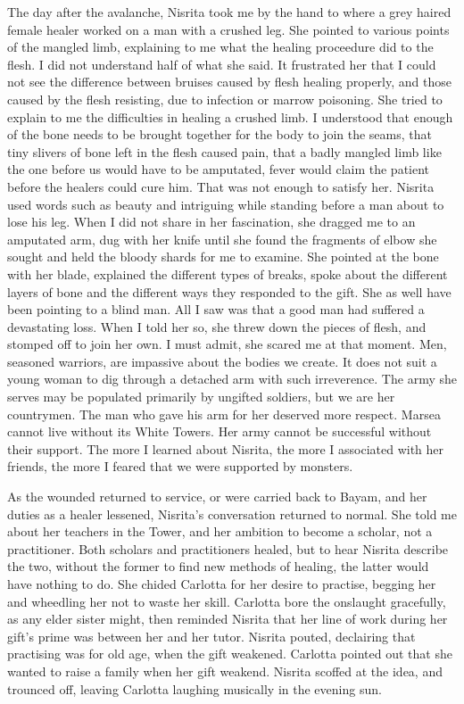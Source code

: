 \documentclass{article}
\begin{document}
The day after the avalanche, Nisrita took me by the hand to where a grey haired female healer worked on a man with a crushed leg. She pointed to various points of the mangled limb, explaining to me what the healing proceedure did to the flesh. I did not understand half of what she said. It frustrated her that I could not see the difference between bruises caused by flesh healing properly, and those caused by the flesh resisting, due to infection or marrow poisoning. She tried to explain to me the difficulties in healing a crushed limb. I understood that enough of the bone needs to be brought together for the body to join the seams, that tiny slivers of bone left in the flesh caused pain, that a badly mangled limb like the one before us would have to be amputated, fever would claim the patient before the healers could cure him. That was not enough to satisfy her. Nisrita used words such as beauty and intriguing while standing before a man about to lose his leg. When I did not share in her fascination, she dragged me to an amputated arm, dug with her knife until she found the fragments of elbow she sought and held the bloody shards for me to examine. She pointed at the bone with her blade, explained the different types of breaks, spoke about the different layers of bone and the different ways they responded to the gift. She as well have been pointing to a blind man. All I saw was that a good man had suffered a devastating loss. When I told her so, she threw down the pieces of flesh, and stomped off to join her own. I must admit, she scared me at that moment. Men, seasoned warriors, are impassive about the bodies we create. It does not suit a young woman to dig through a detached arm with such irreverence. The army she serves may be populated primarily by ungifted soldiers, but we are her countrymen. The man who gave his arm for her deserved more respect. Marsea cannot live without its White Towers. Her army cannot be successful without their support. The more I learned about Nisrita, the more I associated with her friends, the more I feared that we were supported by monsters. 

As the wounded returned to service, or were carried back to Bayam, and her duties as a healer lessened, Nisrita's conversation returned to normal. She told me about her teachers in the Tower, and her ambition to become a scholar, not a practitioner. Both scholars and practitioners healed, but to hear Nisrita describe the two, without the former to find new methods of healing, the latter would have nothing to do. She chided Carlotta for her desire to practise, begging her and wheedling her not to waste her skill. Carlotta bore the onslaught gracefully, as any elder sister might, then reminded Nisrita that her line of work during her gift's prime was between her and her tutor. Nisrita pouted, declairing that practising was for old age, when the gift weakened. Carlotta pointed out that she wanted to raise a family when her gift weakend. Nisrita scoffed at the idea, and trounced off, leaving Carlotta laughing musically in the evening sun. 
\end{document}
